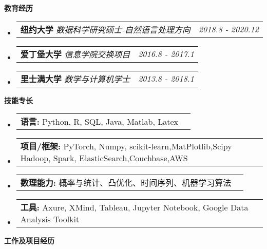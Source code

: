 \documentclass[letterpaper,10pt]{article}
\makeatletter
\newcommand{\resitem}[1]{\item #1 \vspace{-3.5pt}}
\newcommand{\resheading}[1]{{\large \colorbox{mygrey}{\begin{minipage}{\textwidth}{\textbf{#1 \vphantom{p\^{E}}}}\end{minipage}}}}
\newcommand{\ressubheading}[4]{
\begin{tabular*}{7.0in}{l@{\extracolsep{\fill}}r}
		\textbf{#1} \textit{#2}#3 & \textit{#4} \\
\end{tabular*}\vspace{-6pt}}
\makeatother
\begin{document}
\vspace{-0.2in}

\resheading{教育经历}
\begin{itemize}
    \item
    \setlength\itemsep{0.05em}
	\ressubheading{纽约大学}{数据科学研究硕士-自然语言处理方向}{}{2018.8 - 2020.12}
    \item\ressubheading{爱丁堡大学}{信息学院交换项目}{}{2016.8 - 2017.1}
	\item\ressubheading{里士满大学}{数学与计算机学士}{}{2013.8 - 2018.1}
\end{itemize}

\resheading{技能专长}
\begin{itemize}
\setlength\itemsep{0em}
    \item\ressubheading{语言: }{}{Python, R, SQL, Java, Matlab, Latex}{}
	\item\ressubheading{项目/框架: }{}{PyTorch, Numpy, scikit-learn,MatPlotlib,Scipy Hadoop, Spark, ElasticSearch,Couchbase,AWS}{}
	\item\ressubheading{数理能力: }{}{概率与统计、凸优化、时间序列、机器学习算法}{}
    \item\ressubheading{工具: }{}{Axure, XMind, Tableau, Jupyter Notebook, Google Data Analysis Toolkit}{}
\end{itemize}

\resheading{工作及项目经历}
\end{document}
